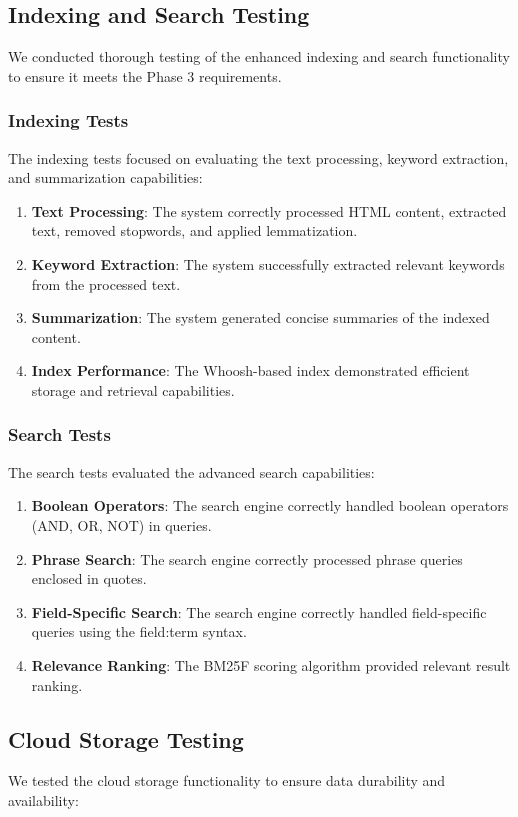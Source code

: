 \documentclass[12pt]{article}
\begin{document}
\subsection{Indexing and Search Testing}
We conducted thorough testing of the enhanced indexing and search functionality to ensure it meets the Phase 3 requirements.

\subsubsection{Indexing Tests}
The indexing tests focused on evaluating the text processing, keyword extraction, and summarization capabilities:

\begin{enumerate}
    \item \textbf{Text Processing}: The system correctly processed HTML content, extracted text, removed stopwords, and applied lemmatization.
    \item \textbf{Keyword Extraction}: The system successfully extracted relevant keywords from the processed text.
    \item \textbf{Summarization}: The system generated concise summaries of the indexed content.
    \item \textbf{Index Performance}: The Whoosh-based index demonstrated efficient storage and retrieval capabilities.
\end{enumerate}

\subsubsection{Search Tests}
The search tests evaluated the advanced search capabilities:

\begin{enumerate}
    \item \textbf{Boolean Operators}: The search engine correctly handled boolean operators (AND, OR, NOT) in queries.
    \item \textbf{Phrase Search}: The search engine correctly processed phrase queries enclosed in quotes.
    \item \textbf{Field-Specific Search}: The search engine correctly handled field-specific queries using the field:term syntax.
    \item \textbf{Relevance Ranking}: The BM25F scoring algorithm provided relevant result ranking.
\end{enumerate}

\subsection{Cloud Storage Testing}
We tested the cloud storage functionality to ensure data durability and availability:
\end{document}
